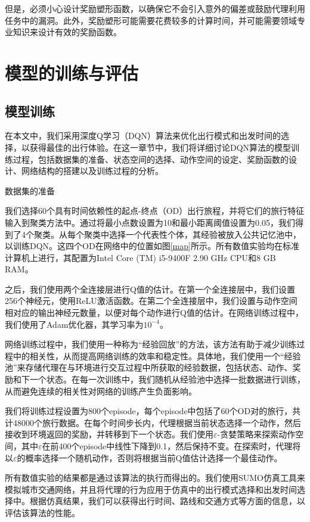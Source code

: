 但是，必须小心设计奖励塑形函数，以确保它不会引入意外的偏差或鼓励代理利用任务中的漏洞。此外，奖励塑形可能需要花费较多的计算时间，并可能需要领域专业知识来设计有效的奖励函数。

\section{模型的训练与评估}

\subsection{模型训练}

在本文中，我们采用深度Q学习（DQN）算法来优化出行模式和出发时间的选择，以获得最佳的出行体验。在这一章节中，我们将详细讨论DQN算法的模型训练过程，包括数据集的准备、状态空间的选择、动作空间的设定、奖励函数的设计、网络结构的搭建以及训练过程的分析。

数据集的准备

我们选择60个具有时间依赖性的起点-终点（OD）出行旅程，并将它们的旅行特征输入到聚类方法中。通过将最小点数设置为10和最小距离阈值设置为0.05，我们得到了4个聚类。从每个聚类中选择一个代表性个体，其经验被放入公共记忆池中，以训练DQN。这四个OD在网络中的位置如图\ref{map}所示。所有数值实验均在标准计算机上进行，其配置为Intel Core (TM) i5-9400F 2.90 GHz CPU和8 GB RAM。

之后，我们使用两个全连接层进行Q值的估计。在第一个全连接层中，我们设置256个神经元，使用ReLU激活函数。在第二个全连接层中，我们设置与动作空间相对应的输出神经元数量，以便对每个动作进行Q值的估计。在网络训练过程中，我们使用了Adam优化器，其学习率为$10^{-4}$。

网络训练过程中，我们使用一种称为“经验回放”的方法，该方法有助于减少训练过程中的相关性，从而提高网络训练的效率和稳定性。具体地，我们使用一个“经验池”来存储代理在与环境进行交互过程中所获取的经验数据，包括状态、动作、奖励和下一个状态。在每一次训练中，我们随机从经验池中选择一批数据进行训练，从而避免连续的相关性对网络的训练产生负面影响。

我们将训练过程设置为800个episode，每个episode中包括了60个OD对的旅行，共计48000个旅行数据。在每个时间步长内，代理根据当前状态选择一个动作，然后接收到环境返回的奖励，并转移到下一个状态。我们使用$\varepsilon$-贪婪策略来探索动作空间，其中$\varepsilon$在前400个episode中线性下降到0.1，然后保持不变。在探索时，代理将以$\varepsilon$的概率选择一个随机动作，否则将根据当前Q值估计选择一个最佳动作。

所有数值实验的结果都是通过该算法的执行而得出的。我们使用SUMO仿真工具来模拟城市交通网络，并且将代理的行为应用于仿真中的出行模式选择和出发时间选择中。根据仿真结果，我们可以获得出行时间、路线和交通方式等方面的信息，以评估该算法的性能。

